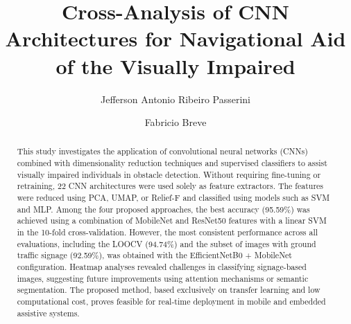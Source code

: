 \documentclass[preprint,12pt]{elsarticle}
\begin{document}
\begin{frontmatter}



\title{Cross-Analysis of CNN Architectures for Navigational Aid of the Visually Impaired}


\author{Jefferson Antonio Ribeiro Passerini}
\author{Fabricio Breve}
\address{Institute of Geosciences and Exact Sciences,
	S\~{a}o Paulo State University (UNESP), Rio Claro, SP, 13506-900, Brazil}
	
\begin{abstract}
	This study investigates the application of convolutional neural networks (CNNs) combined with dimensionality reduction techniques and supervised classifiers to assist visually impaired individuals in obstacle detection. Without requiring fine-tuning or retraining, 22 CNN architectures were used solely as feature extractors. The features were reduced using PCA, UMAP, or Relief-F and classified using models such as SVM and MLP. Among the four proposed approaches, the best accuracy (95.59\%) was achieved using a combination of MobileNet and ResNet50 features with a linear SVM in the 10-fold cross-validation. However, the most consistent performance across all evaluations, including the LOOCV (94.74\%) and the subset of images with ground traffic signage (92.59\%), was obtained with the EfficientNetB0 + MobileNet configuration. Heatmap analyses revealed challenges in classifying signage-based images, suggesting future improvements using attention mechanisms or semantic segmentation. The proposed method, based exclusively on transfer learning and low computational cost, proves feasible for real-time deployment in mobile and embedded assistive systems.
\end{abstract}


\end{frontmatter}
\end{document}
